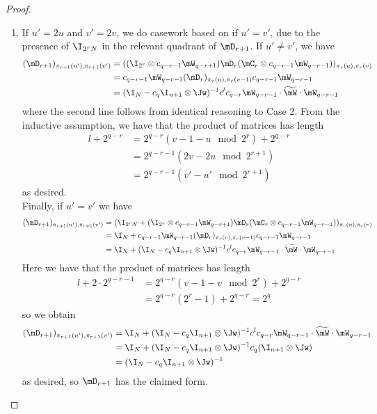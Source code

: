 \begin{proof}
\begin{enumerate}
    \item If $u'=2u$ and $v'=2v$, we do casework based on if $u'=v'$, due to the presence of $\I_{2^rN}$ in the relevant quadrant of $\mD_{r+1}$. If $u'\neq v'$, we have
    \begin{align*}
        (\mD_{r+1})_{\pi_{r+1}(u'),\pi_{r+1}(v')}
        &= ((\I_{2^r}\otimes c_{q-r-1}\mW_{q-r+1})\mD_{r}(\mC_{r} \otimes c_{q-r-1}\mW_{q-r-1}))_{\pi_r(u),\pi_r(v)}\\
        &=   c_{q-r-1}\mW_{q-r-1}(\mD_r)_{\pi_r(u),\pi_r(v-1)}c_{q-r-1}\mW_{q-r-1}\\
        &= (\I_N-c_q\I_{n+1}\otimes\Jw)^{-1}c^{l}c_{q-r}\mW_{q-r-1}\cdot \widetilde{\mW}\cdot \mW_{q-r-1}%
    \end{align*}
    where %
    the second line follows from identical reasoning to Case 2. From the inductive assumption, we have that the product of matrices has length 
    \begin{align*}
        l+2^{q-r}&=2^{q-r}(v-1-u \mod 2^{r})+2^{q-r}\\
        &=2^{q-r-1}(2v-2u \mod 2^{r+1})\\
        &=2^{q-r-1}(v'-u' \mod 2^{r+1})
    \end{align*}
    as desired.\\
    
    Finally, if $u'=v'$ we have 
     \begin{align*}
        (\mD_{r+1})_{\pi_{r+1}(u'),\pi_{r+1}(v')} &= (\I_{2^{r}N}+(\I_{2^r}\otimes c_{q-r-1}\mW_{q-r+1})\mD_{r}(\mC_{r} \otimes c_{q-r-1}\mW_{q-r-1}))_{\pi_r(u),\pi_r(v)}\\
        &= \I_N+c_{q-r-1}\mW_{q-r-1}(\mD_r)_{\pi_r(v),\pi_r(v-1)}c_{q-r-1}\mW_{q-r-1}\\
        &= \I_N+(\I_N-c_q\I_{n+1}\otimes\Jw)^{-1}c^{l}c_{q-r}\mW_{q-r-1}\cdot \widetilde{\mW}\cdot \mW_{q-r-1}
    \end{align*}
    Here we have that the product of matrices has length 
    \begin{align*}
        l+2\cdot 2^{q-r-1} &=2^{q-r}(v-1-v \mod 2^r)+ 2^{q-r}\\
        &=2^{q-r}(2^r-1)+2^{q-r}=2^q
    \end{align*} 
    so we obtain 
    \begin{align*}
        (\mD_{r+1})_{\pi_{r+1}(u'),\pi_{r+1}(v')} &= \I_N+(\I_N-c_q\I_{n+1}\otimes\Jw)^{-1}c^{l}c_{q-r}\mW_{q-r-1}\cdot \widetilde{\mW}\cdot \mW_{q-r-1}\\
        &= \I_N+(\I_N-c_q\I_{n+1}\otimes\Jw)^{-1}c_q(\I_{n+1}\otimes\Jw)\\
        &=(\I_N-c_q\I_{n+1}\otimes\Jw)^{-1}
    \end{align*}
    as desired, so $\mD_{r+1}$ has the claimed form.
\end{enumerate}


\end{proof}
